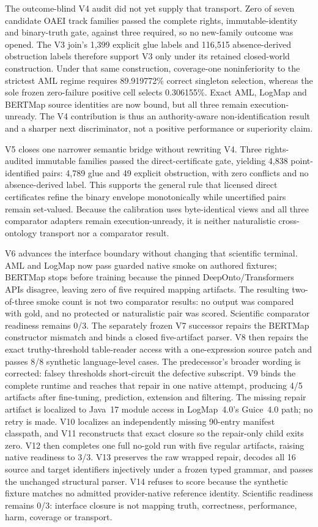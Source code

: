 The outcome-blind V4 audit did not yet supply that transport. Zero of seven
candidate OAEI track families passed the complete rights, immutable-identity
and binary-truth gate, against three required, so no new-family outcome was
opened. The V3 join's 1,399 explicit glue labels and 116,515 absence-derived
obstruction labels therefore support V3 only under its retained closed-world
construction. Under that same construction, coverage-one noninferiority to the
strictest AML regime requires 89.919772\% correct singleton selection, whereas
the sole frozen zero-failure positive cell selects 0.306155\%. Exact AML,
LogMap and BERTMap source identities are now bound, but all three remain
execution-unready. The V4 contribution is thus an authority-aware
non-identification result and a sharper next discriminator, not a positive
performance or superiority claim.

V5 closes one narrower semantic bridge without rewriting V4. Three
rights-audited immutable families passed the direct-certificate gate, yielding
4,838 point-identified pairs: 4,789 glue and 49 explicit obstruction, with zero
conflicts and no absence-derived label. This supports the general rule that
licensed direct certificates refine the binary envelope monotonically while
uncertified pairs remain set-valued. Because the calibration uses
byte-identical views and all three comparator adapters remain execution-unready,
it is neither naturalistic cross-ontology transport nor a comparator result.

V6 advances the interface boundary without changing that scientific terminal.
AML and LogMap now pass guarded native smoke on authored fixtures; BERTMap
stops before training because the pinned DeepOnto/Transformers APIs disagree,
leaving zero of five required mapping artifacts. The resulting two-of-three
smoke count is not two comparator results: no output was compared with gold,
and no protected or naturalistic pair was scored. Scientific comparator
readiness remains 0/3. The separately frozen V7 successor repairs the
BERTMap constructor mismatch and binds a closed five-artifact parser. V8 then
repairs the exact truthy-threshold table-reader access with a one-expression
source patch and passes 8/8 synthetic language-level cases. The predecessor's
broader wording is corrected: falsey thresholds short-circuit the defective
subscript. V9 binds the complete runtime and reaches that repair in one native
attempt, producing 4/5 artifacts after fine-tuning, prediction, extension and
filtering. The missing repair artifact is localized to Java~17 module access in
LogMap~4.0's Guice~4.0 path; no retry is made. V10 localizes an independently
missing 90-entry manifest classpath, and V11 reconstructs that exact closure so
the repair-only child exits zero. V12 then completes one full no-gold run with
five regular artifacts, raising native readiness to 3/3. V13 preserves the raw
wrapped repair, decodes all 16 source and target identifiers injectively under a
frozen typed grammar, and passes the unchanged structural parser. V14 refuses
to score because the synthetic fixture matches no admitted provider-native
reference identity. Scientific readiness remains 0/3: interface closure is not
mapping truth, correctness, performance, harm, coverage or transport.

